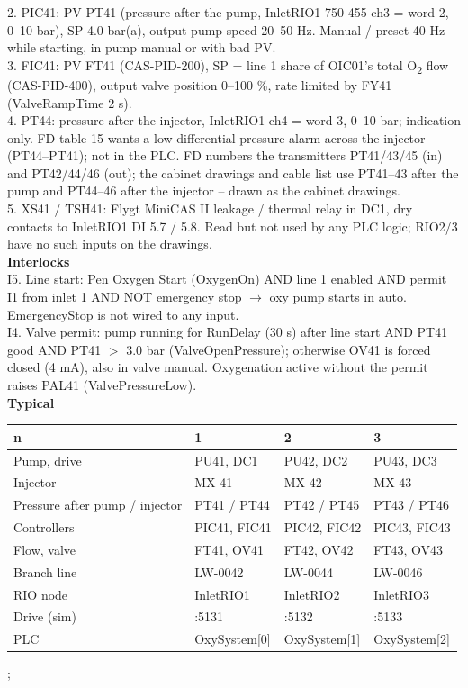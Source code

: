 {{    2. PIC41: PV PT41 (pressure after the pump, InletRIO1 750-455 ch3 = word 2, 0--10 bar), SP 4.0 bar(a),
       output pump speed 20--50 Hz. Manual / preset 40 Hz while starting, in pump manual or with bad PV.\\[0.8mm]
    3. FIC41: PV FT41 (CAS-PID-200), SP = line 1 share of OIC01's total O\textsubscript{2} flow (CAS-PID-400),
       output valve position 0--100 \%, rate limited by FY41 (ValveRampTime 2 s).\\[0.8mm]
    4. PT44: pressure after the injector, InletRIO1 ch4 = word 3, 0--10 bar; indication only.
       \textcolor{pidcheck}{FD table 15 wants a low differential-pressure alarm across the injector (PT44--PT41); not in
       the PLC. FD numbers the transmitters PT41/43/45 (in) and PT42/44/46 (out); the cabinet drawings and
       cable list use PT41--43 after the pump and PT44--46 after the injector -- drawn as the cabinet drawings.}\\[0.8mm]
    5. XS41 / TSH41: Flygt MiniCAS II leakage / thermal relay in DC1, dry contacts to InletRIO1 DI 5.7 / 5.8.
       \textcolor{pidcheck}{Read but not used by any PLC logic; RIO2/3 have no such inputs on the drawings.}\\[1.5mm]
    \textbf{Interlocks}\\[1mm]
    I5. Line start: Pen Oxygen Start (OxygenOn) AND line 1 enabled AND permit I1 from inlet 1 AND NOT emergency stop
        $\rightarrow$ oxy pump starts in auto. \textcolor{pidcheck}{EmergencyStop is not wired to any input.}\\[0.8mm]
    I4. Valve permit: pump running for RunDelay (30 s) after line start AND PT41 good AND PT41 $>$ 3.0 bar
        (ValveOpenPressure); otherwise OV41 is forced closed (4 mA), also in valve manual. Oxygenation active
        without the permit raises PAL41 (ValvePressureLow).\\[1.5mm]
    \textbf{Typical}\\[0.5mm]
    \begin{tabular}{@{}llll@{}}
      \toprule
      n & 1 & 2 & 3 \\
      \midrule
      Pump, drive & PU41, DC1 & PU42, DC2 & PU43, DC3 \\
      Injector & MX-41 & MX-42 & MX-43 \\
      Pressure after pump / injector & PT41 / PT44 & PT42 / PT45 & PT43 / PT46 \\
      Controllers & PIC41, FIC41 & PIC42, FIC42 & PIC43, FIC43 \\
      Flow, valve & FT41, OV41 & FT42, OV42 & FT43, OV43 \\
      Branch line & LW-0042 & LW-0044 & LW-0046 \\
      RIO node & InletRIO1 & InletRIO2 & InletRIO3 \\
      Drive (sim) & :5131 & :5132 & :5133 \\
      PLC & OxySystem[0] & OxySystem[1] & OxySystem[2] \\
      \bottomrule
    \end{tabular}
  };
}
